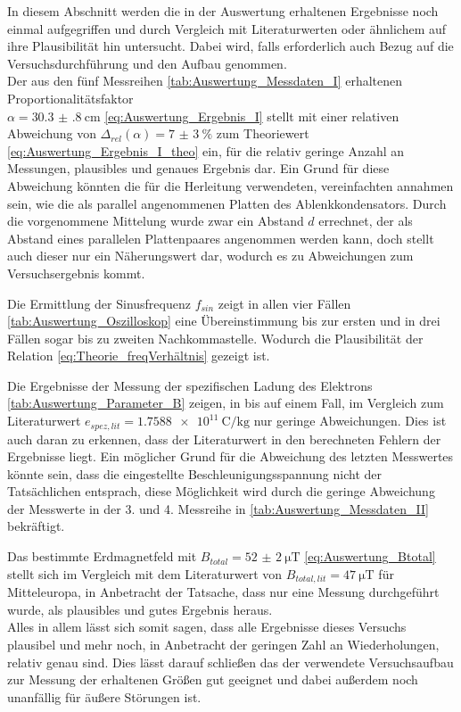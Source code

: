 In diesem Abschnitt werden die in der Auswertung erhaltenen Ergebnisse 
noch einmal aufgegriffen und durch Vergleich mit Literaturwerten 
oder ähnlichem auf ihre Plausibilität hin untersucht. Dabei 
wird, falls erforderlich auch Bezug auf die Versuchsdurchführung 
und den Aufbau genommen. \\

Der aus den fünf Messreihen \cref{tab:Auswertung_Messdaten_I} erhaltenen Proportionalitätsfaktor\\  $ \alpha = \SI{30.3(8)}{\centi\meter}$ \cref{eq:Auswertung_Ergebnis_I} 
stellt mit einer relativen Abweichung von $\Delta_{rel}(\alpha) = \SI{7(3)}{\percent}$ zum 
Theoriewert \cref{eq:Auswertung_Ergebnis_I_theo} ein, für die relativ geringe Anzahl an Messungen, 
plausibles und genaues Ergebnis dar.
Ein Grund für diese Abweichung könnten die für die Herleitung verwendeten, vereinfachten 
annahmen sein, wie die als parallel angenommenen Platten des Ablenkkondensators.
Durch die vorgenommene Mittelung wurde zwar ein Abstand $d$ errechnet, der als Abstand 
eines parallelen Plattenpaares angenommen werden kann, doch stellt auch dieser  
nur ein Näherungswert dar, wodurch es zu Abweichungen zum Versuchsergebnis kommt.


Die Ermittlung der Sinusfrequenz $f_{sin}$ zeigt in allen vier Fällen 
\cref{tab:Auswertung_Oszilloskop} eine Übereinstimmung bis zur ersten und
in drei Fällen sogar bis zu zweiten Nachkommastelle. Wodurch die
Plausibilität der Relation \cref{eq:Theorie_freqVerhältnis} gezeigt ist.

Die Ergebnisse der Messung der spezifischen Ladung des Elektrons 
\cref{tab:Auswertung_Parameter_B} zeigen, in bis auf einem Fall, 
im Vergleich zum Literaturwert
$e_{spez,lit} = \SI{1.7588e11}{\coulomb\per\kilo\g}$\cite{Mende09} nur geringe Abweichungen.
Dies ist auch daran zu erkennen, dass der Literaturwert in den berechneten 
Fehlern der Ergebnisse liegt.
Ein möglicher Grund für die Abweichung des letzten Messwertes könnte sein, 
dass die eingestellte Beschleunigungsspannung nicht der Tatsächlichen entsprach,
diese Möglichkeit wird durch die geringe Abweichung der Messwerte in der 3. und 4.
Messreihe in \cref{tab:Auswertung_Messdaten_II} bekräftigt.

Das bestimmte Erdmagnetfeld mit $B_{total} =  \SI{52(2)}{\micro\tesla}$ 
\cref{eq:Auswertung_Btotal} stellt sich im Vergleich mit dem Literaturwert von
$B_{total,lit} = \SI{47}{\micro\tesla}$ \cite{GGU} für Mitteleuropa,
in Anbetracht der Tatsache, dass nur eine Messung durchgeführt wurde, als 
plausibles und gutes Ergebnis heraus. \\

Alles in allem lässt sich somit sagen, dass alle Ergebnisse dieses Versuchs
plausibel und mehr noch, in Anbetracht der geringen Zahl an Wiederholungen,
relativ genau sind. Dies lässt darauf schließen das der verwendete Versuchsaufbau
zur Messung der erhaltenen Größen gut geeignet und dabei außerdem noch unanfällig
für äußere Störungen ist.   
